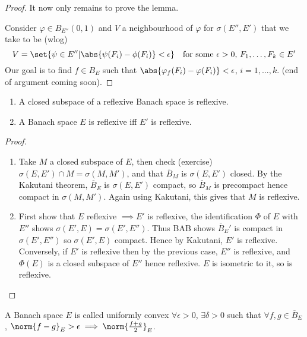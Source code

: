 \documentclass[twoside]{article}
\begin{document}
\begin{proof}
    It now only remains to prove the lemma.

    Consider $\varphi \in B_{E''}(0, 1)$ and $V$ a neighbourhood of $\varphi$ for $\sigma(E'', E')$ that we take to be (wlog)
    \begin{equation*}
        V = \set{\psi \in E'' | \abs{\psi(F_i) - \phi(F_i)} < \epsilon} \quad \text{for some $\epsilon > 0$, $F_1, \dotsc, F_k \in E'$}
    \end{equation*}
    Our goal is to find $f \in B_E$ such that $\abs{\varphi_f(F_i) - \varphi(F_i)} < \epsilon$, $i = 1, \dotsc, k$.
    (end of argument coming soon).
\end{proof}

\begin{cor}\leavevmode
    \begin{enumerate}[label=(\roman*)]
        \item A closed subspace of a reflexive Banach space is reflexive.
        \item A Banach space $E$ is reflexive iff $E'$ is reflexive.
    \end{enumerate}
\end{cor}
\begin{proof}\leavevmode
    \begin{enumerate}[label=(\roman*)]
        \item Take $M$ a closed subspace of $E$, then check (exercise) $\sigma(E, E') \cap M = \sigma(M, M')$, and that $\overline{B}_M$ is $\sigma(E, E')$ closed.
            By the Kakutani theorem, $\overline{B}_E$ is $\sigma(E, E')$ compact, so $\overline{B}_M$ is precompact hence compact in $\sigma(M, M')$.
            Again using Kakutani, this gives that $M$ is reflexive.
        \item First show that $E$ reflexive $\implies E'$ is reflexive, the identification $\Phi$ of $E$ with $E''$ shows $\sigma(E', E) = \sigma(E', E'')$.
            Thus BAB shows $\overline{B}_E'$ is compact in $\sigma(E', E'')$ so $\sigma(E', E)$ compact. Hence by Kakutani, $E'$ is reflexive.
            Conversely, if $E'$ is reflexive then by the previous case, $E''$ is reflexive, and $\Phi(E)$ is a closed subspace of $E''$ hence reflexive.
            $E$ is isometric to it, so is reflexive.
    \end{enumerate}
\end{proof}

\begin{defi}
    A Banach space $E$ is called uniformly convex $\forall \epsilon > 0$, $\exists \delta > 0$ such that $\forall f, g \in \overline{B}_E$, $\norm{f-g}_E > \epsilon \implies \norm{\frac{f+g}{2}}_E$.
\end{defi}
\begin{eg}
\end{eg}
\end{document}
